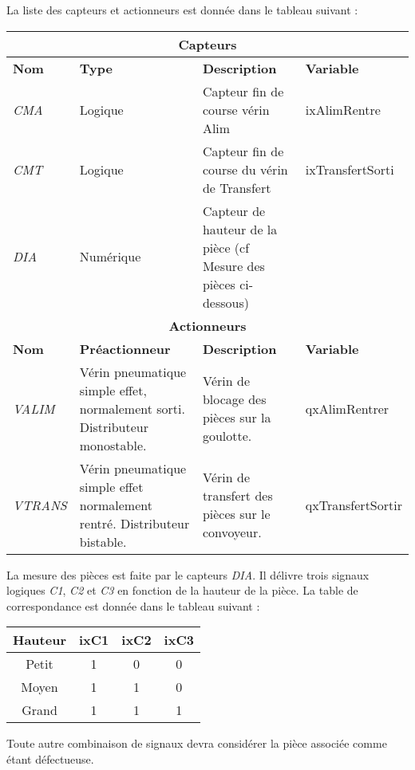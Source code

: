 La liste des capteurs et actionneurs est donnée dans le tableau suivant :
\begin{center}
    \begin{tabular}{|l|p{}|p{}|l|}
        \hline
        \multicolumn{4}{|c|}{\textbf{Capteurs}}\\ \hline
        \textbf{Nom} & \textbf{Type} & \textbf{Description} & \textbf{Variable}\\
        \hline
        \emph{CMA} & Logique & Capteur fin de course vérin Alim & ixAlimRentre \\ \hline
        \emph{CMT} & Logique & Capteur fin de course du vérin de Transfert & ixTransfertSorti \\\hline
         \emph{DIA} & Numérique & Capteur de hauteur de la pièce (cf Mesure des pièces ci-dessous) & \\ \hline\hline
         \multicolumn{4}{|c|}{\textbf{Actionneurs}}\\\hline
         \textbf{Nom} & \textbf{Préactionneur} & \textbf{Description}  & \textbf{Variable} \\
        \hline
         \emph{VALIM} & Vérin pneumatique simple effet, normalement sorti. Distributeur monostable. & Vérin de blocage des pièces sur la goulotte. & qxAlimRentrer \\ \hline
         \emph{VTRANS} & Vérin pneumatique simple effet normalement rentré. Distributeur bistable. & Vérin de transfert des pièces sur le convoyeur. & qxTransfertSortir \\\hline
    \end{tabular}
\end{center}

La mesure des pièces est faite par le capteurs \emph{DIA}. Il délivre trois signaux logiques \emph{C1}, \emph{C2} et \emph{C3} en fonction de la hauteur de la pièce. La table de correspondance est donnée dans le tableau suivant :

\begin{center}
    \begin{tabular}{|c|c|c|c|}
        \hline
        \textbf{Hauteur} & \textbf{ixC1} & \textbf{ixC2} & \textbf{ixC3} \\ \hline
        Petit & 1 & 0 & 0 \\ \hline
        Moyen & 1 & 1 & 0 \\ \hline
        Grand & 1 & 1 & 1 \\ \hline
    \end{tabular}
\end{center}
Toute autre combinaison de signaux devra considérer la pièce associée comme étant défectueuse. 

